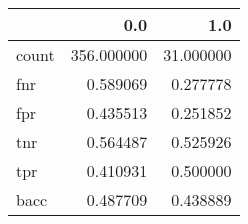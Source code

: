 \begin{tabular}{lrr}
\toprule
{} &         0.0 &        1.0 \\
\midrule
count &  356.000000 &  31.000000 \\
fnr   &    0.589069 &   0.277778 \\
fpr   &    0.435513 &   0.251852 \\
tnr   &    0.564487 &   0.525926 \\
tpr   &    0.410931 &   0.500000 \\
bacc  &    0.487709 &   0.438889 \\
\bottomrule
\end{tabular}
